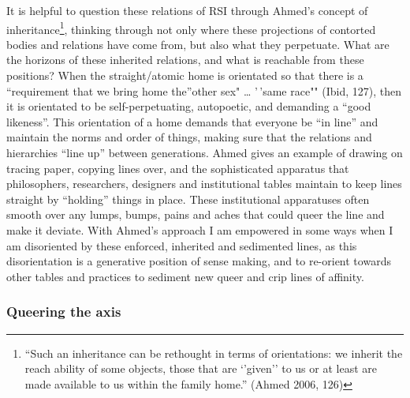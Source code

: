 It is helpful to question these relations of RSI through Ahmed's concept
of inheritance\footnote{``Such an inheritance can be rethought in terms
  of orientations: we inherit the reach ability of some objects, those
  that are `'given'' to us or at least are made available to us within
  the family home.'' (Ahmed 2006, 126)}, thinking through not only where
these projections of contorted bodies and relations have come from, but
also what they perpetuate. What are the horizons of these inherited
relations, and what is reachable from these positions? When the
straight/atomic home is orientated so that there is a ``requirement that
we bring home the''other sex" \ldots{} '\,'same race"" (Ibid, 127), then
it is orientated to be self-perpetuating, autopoetic, and demanding a
``good likeness''. This orientation of a home demands that everyone be
``in line'' and maintain the norms and order of things, making sure that
the relations and hierarchies ``line up'' between generations. Ahmed
gives an example of drawing on tracing paper, copying lines over, and
the sophisticated apparatus that philosophers, researchers, designers
and institutional tables maintain to keep lines straight by ``holding''
things in place. These institutional apparatuses often smooth over any
lumps, bumps, pains and aches that could queer the line and make it
deviate. With Ahmed's approach I am empowered in some ways when I am
disoriented by these enforced, inherited and sedimented lines, as this
disorientation is a generative position of sense making, and to
re-orient towards other tables and practices to sediment new queer and
crip lines of affinity.

\hypertarget{queering-the-axis}{%
\subsubsection{Queering the axis}\label{queering-the-axis}}

